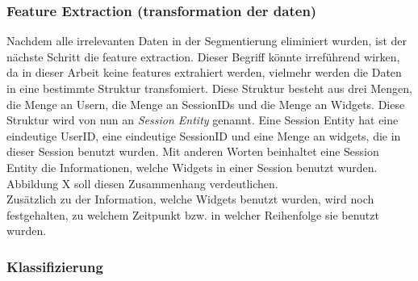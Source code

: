 \subsubsection{Feature Extraction (transformation der daten)}
\label{ssub:Feature_extraction}
Nachdem alle irrelevanten Daten in der Segmentierung eliminiert wurden, ist der nächste Schritt die feature extraction. Dieser Begriff könnte irreführend wirken, da in dieser Arbeit keine features extrahiert werden, vielmehr werden die Daten in eine bestimmte Struktur transfomiert. Diese Struktur besteht aus drei Mengen, die Menge an Usern, die Menge an SessionIDs und die Menge an Widgets. Diese Struktur wird von nun an \textit{Session Entity} genannt. Eine Session Entity hat eine eindeutige UserID, eine eindeutige SessionID und eine Menge an widgets, die in dieser Session benutzt wurden. Mit anderen Worten beinhaltet eine Session Entity die Informationen, welche Widgets in einer Session benutzt wurden. Abbildung X soll diesen Zusammenhang verdeutlichen.\\
Zusätzlich zu der Information, welche Widgets benutzt wurden, wird noch festgehalten, zu welchem Zeitpunkt bzw. in welcher Reihenfolge sie benutzt wurden.

\subsubsection{Klassifizierung}
\label{ssub:Klassifizierung}


